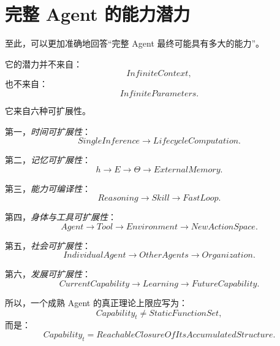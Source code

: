 \section{完整 Agent 的能力潜力}

至此，可以更加准确地回答“完整 Agent 最终可能具有多大的能力”。

它的潜力并不来自：
\begin{equation}
InfiniteContext,
\end{equation}
也不来自：
\begin{equation}
InfiniteParameters.
\end{equation}

它来自六种可扩展性。

第一，\emph{时间可扩展性}：
\begin{equation}
SingleInference
\rightarrow
LifecycleComputation.
\end{equation}

第二，\emph{记忆可扩展性}：
\begin{equation}
h
\rightarrow
E
\rightarrow
\Theta
\rightarrow
ExternalMemory.
\end{equation}

第三，\emph{能力可编译性}：
\begin{equation}
Reasoning
\rightarrow
Skill
\rightarrow
FastLoop.
\end{equation}

第四，\emph{身体与工具可扩展性}：
\begin{equation}
Agent
\rightarrow
Tool
\rightarrow
Environment
\rightarrow
NewActionSpace.
\end{equation}

第五，\emph{社会可扩展性}：
\begin{equation}
IndividualAgent
\rightarrow
OtherAgents
\rightarrow
Organization.
\end{equation}

第六，\emph{发展可扩展性}：
\begin{equation}
CurrentCapability
\rightarrow
Learning
\rightarrow
FutureCapability.
\end{equation}

所以，一个成熟 Agent 的真正理论上限应写为：
\begin{equation}
\boxed{
Capability_t
\neq
StaticFunctionSet,
}
\end{equation}
而是：
\begin{equation}
\boxed{
Capability_t
=
ReachableClosureOfItsAccumulatedStructure.
}
\end{equation}

